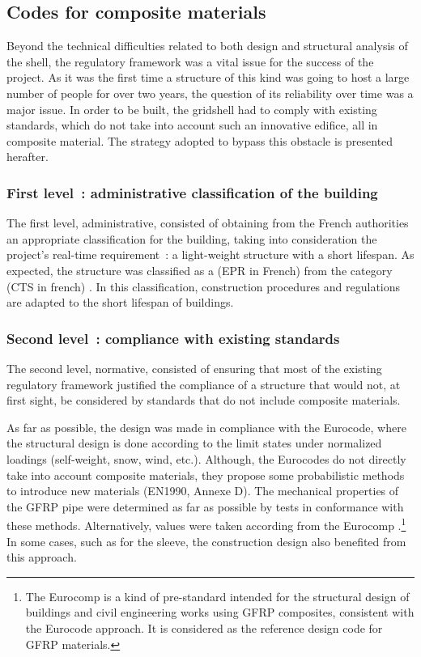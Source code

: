 \subsection{Codes for composite materials}\label{sec=codes}
Beyond the technical difficulties related to both design and structural analysis of the shell, the regulatory framework was a vital issue for the success of the project. As it was the first time a structure of this kind was going to host a large number of people for over two years, the question of its reliability over time was a major issue. In order to be built, the gridshell had to comply with existing standards, which do not take into account such an innovative edifice, all in composite material. The strategy adopted to bypass this obstacle is presented herafter.

\subsubsection{First level~: administrative classification of the building}
The first level, administrative, consisted of obtaining from the French authorities an appropriate classification for the building, taking into
consideration the project’s real-time requirement~: a light-weight structure with a short lifespan. As expected, the structure was classified as a  (EPR in French) from the category  (CTS in french) \cite{SiteSecurite}. In this classification, construction procedures and regulations are adapted to the short lifespan of buildings.

\subsubsection{Second level~: compliance with existing standards}
The second level, normative, consisted of ensuring that most of the existing regulatory framework justified the compliance of a structure that would not, at first sight, be considered by standards that do not include composite materials.

As far as possible, the design was made in compliance with the Eurocode, where the structural design is done according to the limit states under normalized loadings (self-weight, snow, wind, etc.). Although, the Eurocodes do not directly take into account composite materials, they propose some probabilistic methods to introduce new materials (EN1990, Annexe D). The mechanical properties of the GFRP pipe were determined as far as possible by tests in conformance with these methods. Alternatively, values were taken according from the Eurocomp \cite{Clarke2003}.\footnote{The Eurocomp is a kind of pre-standard intended for the structural design of buildings and civil engineering works using GFRP composites, consistent with the Eurocode approach. It is considered as the reference design code for GFRP materials.} In some cases, such as for the sleeve, the construction design also benefited from this approach.

